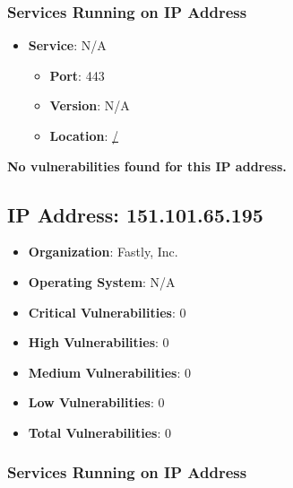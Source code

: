 \documentclass{article}
\begin{document}
\subsubsection*{Services Running on IP Address}

\begin{itemize}
    
        \item \textbf{Service}: N/A
        \begin{itemize}
            \item \textbf{Port}: 443
            \item \textbf{Version}:  N/A 
            \item \textbf{Location}: \href{ / }{ / }
        \end{itemize}
    
\end{itemize}


\textbf{No vulnerabilities found for this IP address.}




\clearpage



\subsection{IP Address: 151.101.65.195}

\begin{itemize}
    \item \textbf{Organization}: Fastly, Inc.
    \item \textbf{Operating System}:  N/A 
    \item \textbf{Critical Vulnerabilities}: 0
    \item \textbf{High Vulnerabilities}: 0
    \item \textbf{Medium Vulnerabilities}: 0
    \item \textbf{Low Vulnerabilities}: 0
    \item \textbf{Total Vulnerabilities}: 0
\end{itemize}

\subsubsection*{Services Running on IP Address}
\end{document}
